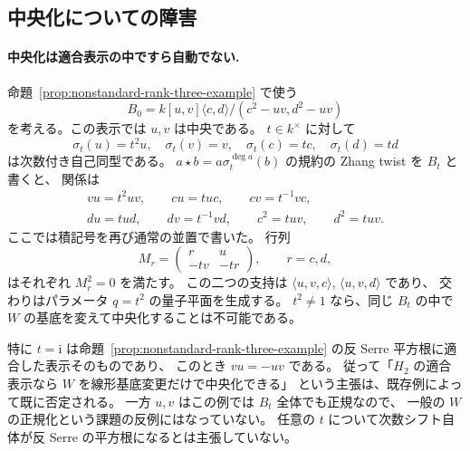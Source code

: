 \subsection{中央化についての障害}

\paragraph{中央化は適合表示の中ですら自動でない.}
命題~\ref{prop:nonstandard-rank-three-example} で使う
\[
 B_0=k[u,v]\langle c,d\rangle/(c^2-uv,d^2-uv)
\]
を考える。この表示では $u,v$ は中央である。
$t\in k^\times$ に対して
\[
 \sigma_t(u)=t^2u,\quad \sigma_t(v)=v,\quad
 \sigma_t(c)=tc,\quad\sigma_t(d)=td
\]
は次数付き自己同型である。
$a\star b=a\sigma_t^{\deg a}(b)$ の規約の Zhang twist を $B_t$ と書くと、
関係は
\[
\begin{gathered}
 vu=t^2uv,\qquad cu=tuc,\qquad cv=t^{-1}vc,\\
 du=tud,\qquad dv=t^{-1}vd,\qquad
 c^2=tuv,\qquad d^2=tuv.
\end{gathered}
\]
ここでは積記号を再び通常の並置で書いた。
行列
\[
 M_r=\begin{pmatrix}r&u\\-tv&-tr\end{pmatrix},\qquad r=c,d,
\]
はそれぞれ $M_r^2=0$ を満たす。
この二つの支持は $\langle u,v,c\rangle$, $\langle u,v,d\rangle$ であり、
交わりはパラメータ $q=t^2$ の量子平面を生成する。
$t^2\ne1$ なら、同じ $B_t$ の中で $W$ の基底を変えて中央化することは不可能である。

特に $t=\mathrm i$ は命題~\ref{prop:nonstandard-rank-three-example} の反 Serre 平方根に適合した表示そのものであり、
このとき $vu=-uv$ である。
従って「$H_2$ の適合表示なら $W$ を線形基底変更だけで中央化できる」
という主張は、既存例によって既に否定される。
一方 $u,v$ はこの例では $B_t$ 全体でも正規なので、
一般の $W$ の正規化という課題の反例にはなっていない。
任意の $t$ について次数シフト自体が反 Serre の平方根になるとは主張していない。
